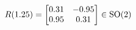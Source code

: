 \documentclass[preview]{standalone}
\begin{document}
\begin{align*}
\special{dvisvgm:raw <g id='unique000'>}R(1.25) = \begin{bmatrix} 0.31 & -0.95 \\ 0.95 & 0.31 \end{bmatrix} \in \text{SO}(2)\special{dvisvgm:raw </g>}
\end{align*}
\end{document}
